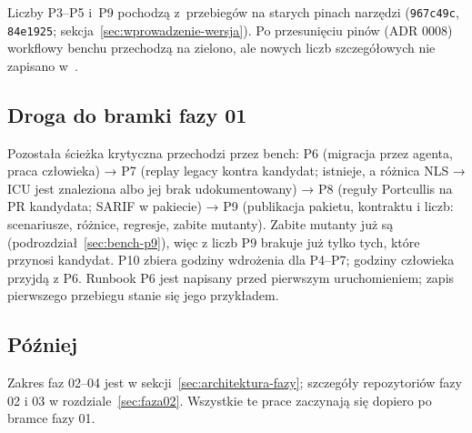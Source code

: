Liczby P3--P5 i~P9 pochodzą z~przebiegów na starych pinach narzędzi (\texttt{967c49c},
\texttt{84e1925}; sekcja~\ref{sec:wprowadzenie-wersja}). Po przesunięciu pinów (ADR 0008)
workflowy benchu przechodzą na zielono, ale nowych liczb szczegółowych nie zapisano
w~.


\subsection{Droga do bramki fazy 01}\label{sec:status-droga}

Pozostała ścieżka krytyczna przechodzi przez bench: P6 (migracja przez agenta, praca
człowieka) → P7 (replay legacy kontra kandydat;  istnieje, a różnica
NLS → ICU jest znaleziona albo jej brak udokumentowany) → P8 (reguły Portcullis na PR
kandydata; SARIF w pakiecie) → P9 (publikacja pakietu, kontraktu i liczb: scenariusze,
różnice, regresje, zabite mutanty). Zabite mutanty już są (podrozdział~\ref{sec:bench-p9}),
więc z liczb P9 brakuje już tylko tych, które przynosi kandydat. P10 zbiera godziny wdrożenia dla P4--P7; godziny
człowieka przyjdą z P6. Runbook P6 jest napisany przed pierwszym uruchomieniem; zapis
pierwszego przebiegu stanie się jego przykładem.


\subsection{Później}\label{sec:status-pozniej}

Zakres faz 02--04 jest w sekcji~\ref{sec:architektura-fazy}; szczegóły repozytoriów fazy
02 i 03 w rozdziale~\ref{sec:faza02}. Wszystkie te prace zaczynają się dopiero po bramce
fazy 01.

